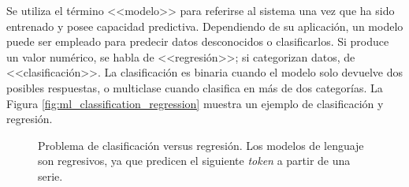 Se utiliza el término <<modelo>> para referirse al sistema una vez que ha sido entrenado y posee capacidad predictiva. Dependiendo de su aplicación, un modelo puede ser empleado para predecir datos desconocidos o clasificarlos. Si produce un valor numérico, se habla de <<regresión>>; si categorizan datos, de <<clasificación>>. La clasificación es binaria cuando el modelo solo devuelve dos posibles respuestas, o multiclase cuando clasifica en más de dos categorías. La Figura \ref{fig:ml_classification_regression} muestra un ejemplo de clasificación y regresión.

\begin{figure}[H]
    \caption[Problema de clasificación versus regresión]{Problema de clasificación versus regresión. Los modelos de lenguaje son regresivos, ya que predicen el siguiente \emph{token} a partir de una serie.}
    \centering
  

\end{figure}
